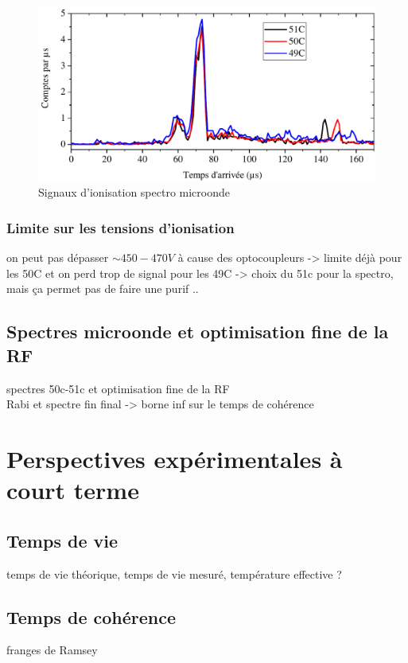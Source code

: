 \begin{figure}[h]
\centering
\includegraphics[width=.85\linewidth]{figures/circulars/arrTimes_49-50-51C}
\caption[Signaux d'ionisation spectro microonde]{
Signaux d'ionisation spectro microonde
}
\label{fig:arrTimes_49-50-51C}
\end{figure}

\newpage
	\subsubsection*{Limite sur les tensions d'ionisation}
	\noindent on peut pas dépasser $\sim 450-470V$ à cause des optocoupleurs -> limite déjà pour les 50C et on perd trop de signal pour les 49C -> choix du 51c pour la spectro, mais ça permet pas de faire une purif ..
	
	\subsection{Spectres microonde et optimisation fine de la RF}
		\noindent spectres 50c-51c et optimisation fine de la RF \\
		\noindent Rabi et spectre fin final -> borne inf sur le temps de cohérence

\section{Perspectives expérimentales à court terme}
	\subsection{Temps de vie}
		\noindent temps de vie théorique, temps de vie mesuré, température effective ?
	\subsection{Temps de cohérence}
		\noindent franges de Ramsey

